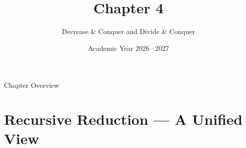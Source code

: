 \documentclass[aspectratio=169]{beamer}
\title[Ch.\,4 -- Recursive Strategies]{Chapter 4}
\subtitle{Decrease \& Conquer and Divide \& Conquer}
\date{Academic Year 2026\,--\,2027}
\begin{document}
\begin{frame}[plain]\titlepage\end{frame}
\begin{frame}[shrink=20]{Chapter Overview}
  \begin{center}
    \begin{minipage}{0.85\textwidth}
      \tableofcontents[hideallsubsections,sectionstyle=show/shaded]
    \end{minipage}
  \end{center}
\end{frame}

\section{Recursive Reduction — A Unified View}
\end{document}
